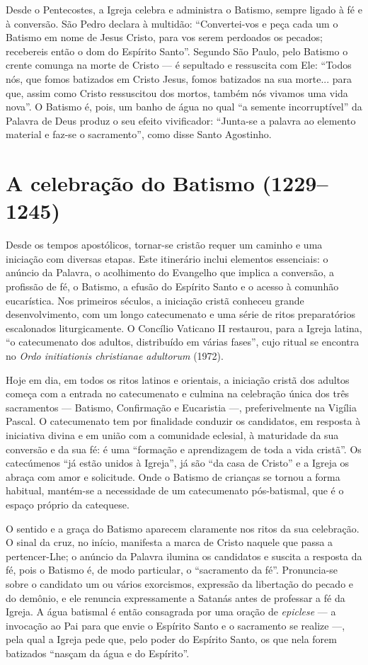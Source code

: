 Desde o Pentecostes, a Igreja celebra e administra o Batismo, sempre ligado à fé e à conversão. São Pedro declara à multidão: ``Convertei-vos e peça cada um o Batismo em nome de Jesus Cristo, para vos serem perdoados os pecados; recebereis então o dom do Espírito Santo''. Segundo São Paulo, pelo Batismo o crente comunga na morte de Cristo --- é sepultado e ressuscita com Ele: ``Todos nós, que fomos batizados em Cristo Jesus, fomos batizados na sua morte... para que, assim como Cristo ressuscitou dos mortos, também nós vivamos uma vida nova''. O Batismo é, pois, um banho de água no qual ``a semente incorruptível'' da Palavra de Deus produz o seu efeito vivificador: ``Junta-se a palavra ao elemento material e faz-se o sacramento'', como disse Santo Agostinho.

\section{A celebração do Batismo (1229--1245)}

Desde os tempos apostólicos, tornar-se cristão requer um caminho e uma iniciação com diversas etapas. Este itinerário inclui elementos essenciais: o anúncio da Palavra, o acolhimento do Evangelho que implica a conversão, a profissão de fé, o Batismo, a efusão do Espírito Santo e o acesso à comunhão eucarística. Nos primeiros séculos, a iniciação cristã conheceu grande desenvolvimento, com um longo catecumenato e uma série de ritos preparatórios escalonados liturgicamente. O Concílio Vaticano II restaurou, para a Igreja latina, ``o catecumenato dos adultos, distribuído em várias fases'', cujo ritual se encontra no \emph{Ordo initiationis christianae adultorum} (1972).

Hoje em dia, em todos os ritos latinos e orientais, a iniciação cristã dos adultos começa com a entrada no catecumenato e culmina na celebração única dos três sacramentos --- Batismo, Confirmação e Eucaristia ---, preferivelmente na Vigília Pascal. O catecumenato tem por finalidade conduzir os candidatos, em resposta à iniciativa divina e em união com a comunidade eclesial, à maturidade da sua conversão e da sua fé: é uma ``formação e aprendizagem de toda a vida cristã''. Os catecúmenos ``já estão unidos à Igreja'', já são ``da casa de Cristo'' e a Igreja os abraça com amor e solicitude. Onde o Batismo de crianças se tornou a forma habitual, mantém-se a necessidade de um catecumenato pós-batismal, que é o espaço próprio da catequese.

O sentido e a graça do Batismo aparecem claramente nos ritos da sua celebração. O sinal da cruz, no início, manifesta a marca de Cristo naquele que passa a pertencer-Lhe; o anúncio da Palavra ilumina os candidatos e suscita a resposta da fé, pois o Batismo é, de modo particular, o ``sacramento da fé''. Pronuncia-se sobre o candidato um ou vários exorcismos, expressão da libertação do pecado e do demônio, e ele renuncia expressamente a Satanás antes de professar a fé da Igreja. A água batismal é então consagrada por uma oração de \emph{epiclese} --- a invocação ao Pai para que envie o Espírito Santo e o sacramento se realize ---, pela qual a Igreja pede que, pelo poder do Espírito Santo, os que nela forem batizados ``nasçam da água e do Espírito''.

